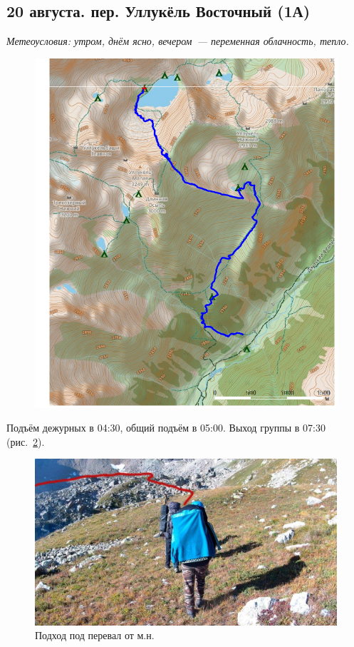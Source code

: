\subsection{20 августа. пер. Уллукёль Восточный (1А)}
\textit{Метеоусловия: утром, днём ясно, вечером~--- переменная облачность, тепло.}

\begin{figure}[h!]
	\centering
	\includegraphics[angle=0, width=0.7\linewidth]{../pics/mini_maps/20}
	\label{fig:mini_20}
\end{figure}

Подъём дежурных в 04:30, общий подъём в 05:00. Выход группы в 07:30 (рис.~\ref{fig:20aug1.jpg}).

\begin{figure}[h!]
	\centering
	\includegraphics[width=0.7\linewidth]{../pics/20aug1.jpg}
	\caption{Подход под перевал от м.н.}
	\label{fig:20aug1.jpg}
\end{figure}

